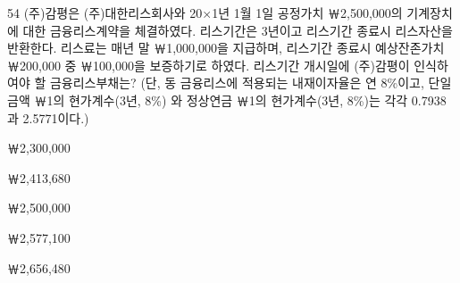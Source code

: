 \begin{question}{54}
(주)감평은 (주)대한리스회사와 20×1년 1월 1일 공정가치 ￦2,500,000의 기계장치에 대한 금융리스계약을 체결하였다. 리스기간은 3년이고 리스기간 종료시 리스자산을 반환한다. 리스료는 매년 말 ￦1,000,000을 지급하며, 리스기간 종료시 예상잔존가치 ￦200,000 중 ￦100,000을 보증하기로 하였다. 리스기간 개시일에 (주)감평이 인식하여야 할 금융리스부채는? (단, 동 금융리스에 적용되는 내재이자율은 연 8\%이고, 단일금액 ￦1의 현가계수(3년, 8\%) 와 정상연금 ￦1의 현가계수(3년, 8\%)는 각각 0.7938과 2.5771이다.)
\begin{choices}
  \item ￦2,300,000
  \item ￦2,413,680
  \item ￦2,500,000
  \item ￦2,577,100
  \item ￦2,656,480
\end{choices}
\end{question}

